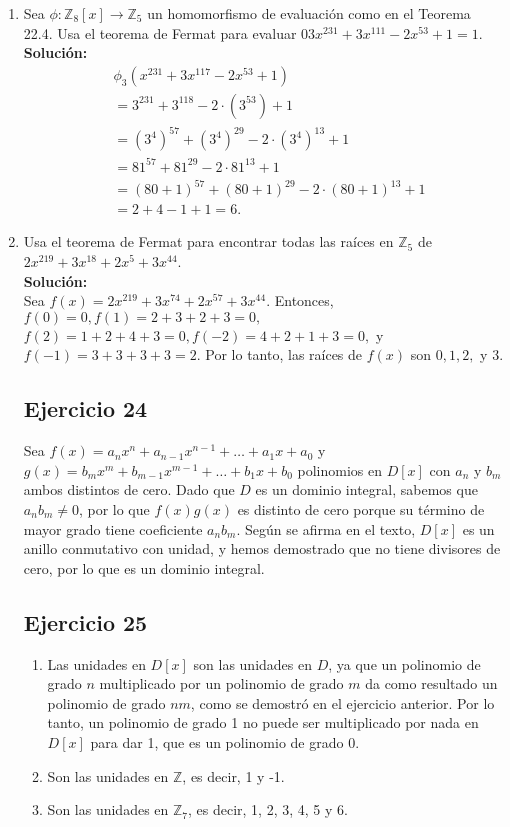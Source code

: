 \begin{enumerate}
	\item Sea $\phi : \mathbb{Z}_8[x] \to \mathbb{Z}_5$ un homomorfismo de evaluación como en el Teorema 22.4. Usa el teorema de Fermat para evaluar $03x^{231} + 3x^{111} - 2x^{53} + 1 = 1$.
	\\ \textbf{Solución:}
	\begin{align*}
		&\phi_3(x^{231} + 3x^{117} - 2x^{53} + 1) \\
		&= 3^{231} + 3^{118} - 2 \cdot (3^{53}) + 1 \\
		&= (3^4)^{57} + (3^4)^{29} - 2 \cdot (3^4)^{13} + 1 \\
		&= 81^{57} + 81^{29} - 2 \cdot 81^{13} + 1 \\
		&= (80 + 1)^{57} + (80 + 1)^{29} - 2 \cdot (80 + 1)^{13} + 1 \\
		&= 2 + 4 - 1 + 1 = 6.
	\end{align*}
	\item Usa el teorema de Fermat para encontrar todas las raíces en $\mathbb{Z}_5$ de $2x^{219} + 3x^{18} + 2x^5 + 3x^{44}$.
	\\ \textbf{Solución:} \\
	Sea  $f(x) = 2x^{219} + 3x^{74} + 2x^{57} + 3x^{44}.$
	Entonces, $f(0) = 0, f(1) = 2 + 3 + 2 + 3 = 0,$
	$f(2) = 1 + 2 + 4 + 3 = 0, f(-2) = 4 + 2 + 1 + 3 = 0,$ 
	y  $f(-1) = 3 + 3 + 3 + 3 = 2.$ Por lo tanto, las raíces de  $f(x)$ son  $0, 1, 2, $ y  $3$.
	
	
	\subsection*{Ejercicio 24}
	
	Sea \(f(x) = a_nx^n + a_{n-1}x^{n-1} + \ldots + a_1x + a_0\) y \(g(x) = b_mx^m + b_{m-1}x^{m-1} + \ldots + b_1x + b_0\) polinomios en \(D[x]\) con \(a_n\) y \(b_m\) ambos distintos de cero. Dado que \(D\) es un dominio integral, sabemos que \(a_n b_m \neq 0\), por lo que \(f(x)g(x)\) es distinto de cero porque su término de mayor grado tiene coeficiente \(a_n b_m\). Según se afirma en el texto, \(D[x]\) es un anillo conmutativo con unidad, y hemos demostrado que no tiene divisores de cero, por lo que es un dominio integral.
	
	\subsection*{Ejercicio 25}
	
	\begin{enumerate}
		\item Las unidades en \(D[x]\) son las unidades en \(D\), ya que un polinomio de grado \(n\) multiplicado por un polinomio de grado \(m\) da como resultado un polinomio de grado \(nm\), como se demostró en el ejercicio anterior. Por lo tanto, un polinomio de grado 1 no puede ser multiplicado por nada en \(D[x]\) para dar 1, que es un polinomio de grado 0.
		\item Son las unidades en \(\mathbb{Z}\), es decir, 1 y -1.
		\item Son las unidades en \(\mathbb{Z}_7\), es decir, 1, 2, 3, 4, 5 y 6.
	\end{enumerate}
	

\end{enumerate}

